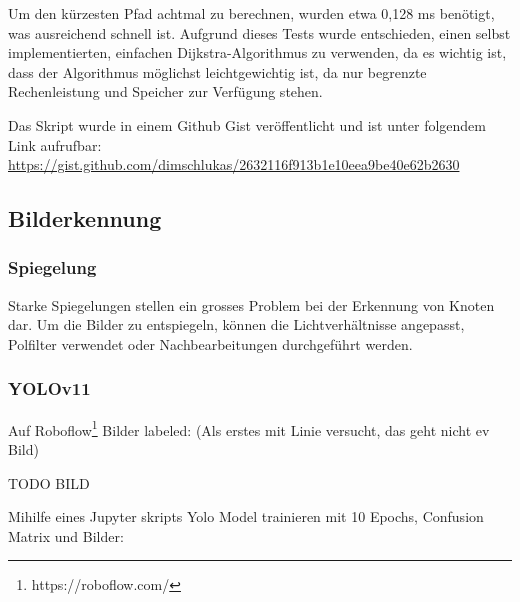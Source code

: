 Um den kürzesten Pfad achtmal zu berechnen, wurden etwa 0,128 ms benötigt, was ausreichend schnell ist. Aufgrund dieses Tests wurde entschieden, einen selbst implementierten, einfachen Dijkstra-Algorithmus zu verwenden, da es wichtig ist, dass der Algorithmus möglichst leichtgewichtig ist, da nur begrenzte Rechenleistung und Speicher zur Verfügung stehen.

Das Skript wurde in einem Github Gist veröffentlicht und ist unter folgendem Link aufrufbar: \url{https://gist.github.com/dimschlukas/2632116f913b1e10eea9be40e62b2630}

\subsection{Bilderkennung}

\subsubsection{Spiegelung}

Starke Spiegelungen stellen ein grosses Problem bei der Erkennung von Knoten dar. Um die Bilder zu entspiegeln, können die Lichtverhältnisse angepasst, Polfilter verwendet oder Nachbearbeitungen durchgeführt werden.\cite{avoid-reflection}

\subsubsection{YOLOv11}

Auf Roboflow\footnote{https://roboflow.com/} Bilder labeled: (Als erstes mit Linie versucht, das geht nicht ev Bild) 

TODO BILD

Mihilfe eines Jupyter skripts Yolo Model trainieren mit 10 Epochs, Confusion Matrix und Bilder:

